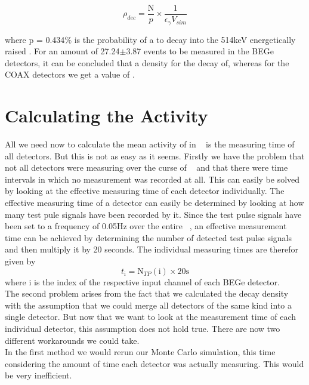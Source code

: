 \begin{equation}
\rho_{dec} = \frac{\mathrm{N}}{p}\times\frac{1}{\epsilon_\gamma V_{sim}}
\label{equ:density}
\end{equation}

where p = 0.434$\%$ is the probability of a \Kr to decay into the 514keV energetically raised .
For an amount of 27.24\(\pm\)3.87 events to be measured in the BEGe detectors, it can be concluded that a density for the \Kr decay of, whereas for the COAX detectors we get a value of . 
\\


\section{Calculating the Activity}
\label{sec:CalcActiv}

All we need now to calculate the mean activity of \Kr in \PII~ is the measuring time of all detectors.
But this is not as easy as it seems.
Firstly we have the problem that not all detectors were measuring over the curse of \PII~ and that there were time intervals in which no measurement was recorded at all.
This can easily be solved by looking at the effective measuring time of each detector individually.
The effective measuring time of a detector can easily be determined by looking at how many test pule signals have been recorded by it. 
Since the test pulse signals have been set to a frequency of 0.05Hz over the entire \PII~, an effective measurement time can be achieved by determining the number of detected test pulse signals and then multiply it by 20 seconds.
The individual measuring times are therefor given by
\begin{equation*}
    t_\mathrm{i} = \mathrm{N}_{TP}(\mathrm{i}) \times 20\mathrm{s}
\end{equation*}
where i is the index of the respective input channel of each BEGe detector.
\\

The second problem arises from the fact that we calculated the decay density with the assumption that we could merge all detectors of the same kind into a single detector.
But now that we want to look at the measurement time of each individual detector, this assumption does not hold true.
There are now two different workarounds we could take.
\\

In the first method we would rerun our Monte Carlo simulation, this time considering the amount of time each detector was actually measuring.
This would be very inefficient.
\\

